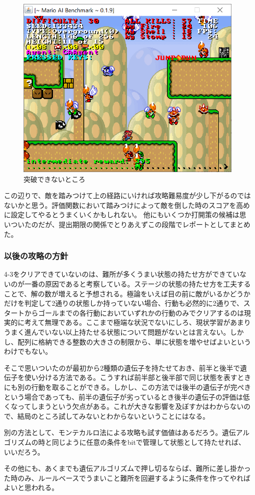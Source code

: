 \documentclass{jsarticle}
\begin{document}
\begin{figure}
	\includegraphics{deadpoint.png}
	\caption{突破できないところ}
\end{figure}

この辺りで、敵を踏みつけて上の経路にいければ攻略難易度が少し下がるのではないかと思う。評価関数において踏みつけによって敵を倒した時のスコアを高めに設定してやるとうまくいくかもしれない。
他にもいくつか打開策の候補は思いついたのだが、提出期限の関係でとりあえずこの段階でレポートとしてまとめた。

\subsubsection{以後の攻略の方針}
4-3をクリアできていないのは、難所が多くうまい状態の持たせ方ができていないのが一番の原因であると考察している。ステージの状態の持たせ方を工夫することで、解の数が増えると予想される。極論をいえば目の前に敵がいるかどうかだけを判定して2通りの状態しか持っていない場合、行動も必然的に2通りで、スタートからゴールまでの各行動においていずれかの行動のみでクリアするのは現実的に考えて無理である。ここまで極端な状況でないにしろ、現状学習があまりうまく進んでいない以上持たせる状態について問題がないとは言えない。しかし、配列に格納できる整数の大きさの制限から、単に状態を増やせばよいというわけでもない。

そこで思いついたのが最初から2種類の遺伝子を持たせておき、前半と後半で遺伝子を使い分ける方法である。こうすれば前半部と後半部で同じ状態を表すときにも別の行動を取ることができる。しかし、この方法では後半の遺伝子が完ぺきという場合であっても、前半の遺伝子が劣っているとき後半の遺伝子の評価は低くなってしまうという欠点がある。これが大きな影響を及ぼすかはわからないので、結局のところ試してみないとわからないということにはなる。

別の方法として、モンテカルロ法による攻略も試す価値はあるだろう。遺伝アルゴリズムの時と同じように任意の条件をbitで管理して状態として持たせれば、いいだろう。

その他にも、あくまでも遺伝アルゴリズムで押し切るならば、難所に差し掛かった時のみ、ルールベースでうまいこと難所を回避するように条件を作ってやればよいと思われる。
\end{document}
